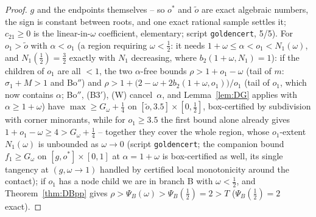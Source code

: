 \documentclass[11pt]{article}
\theoremstyle{definition}
\begin{document}
\begin{proof}
$g$ and the endpoints themselves -- so $o^\ast$ and $\tilde o$ are
exact algebraic numbers, the sign is constant between roots, and one
exact rational sample settles it; $c_{21}\ge0$ is the linear-in-$\omega$
coefficient, elementary; script \texttt{goldencert}, 5/5). For $o_1>\tilde o$ with
$\alpha<o_1$ (a region requiring $\omega<\tfrac12$: it needs
$1+\omega\le\alpha<o_1<N_1(\omega)$, and $N_1(\tfrac12)=\tfrac32$ exactly
with $N_1$ decreasing, where $b_2(1+\omega,N_1)=1$): if the children of
$o_1$ are all $<1$, the two $\alpha$-free bounds
$\rho>1+o_1-\omega$ (tail of $m$: $\sigma_1+M>1$ and Bo$''$) and
$\rho>1+\bigl(2-\omega+2b_2(1+\omega,o_1)\bigr)/o_1$ (tail of $o_1$, which
now contains $\alpha$; Bo$''$, (B3$'$), (W) cancel~$\alpha$, and
Lemma~\ref{lem:DG} applies with $\alpha\ge1+\omega$) have
$\max\ge G_\omega+\tfrac14$ on
$[\tilde o,3.5]\times[0,\tfrac12]$, box-certified by subdivision with
corner minorants, while for $o_1\ge3.5$ the first bound alone already
gives $1+o_1-\omega\ge4>G_\omega+\tfrac14$ -- together they
cover the whole region, whose $o_1$-extent $N_1(\omega)$ is unbounded
as $\omega\to0$ (script \texttt{goldencert}; the companion bound
$f_1\ge G_\omega$ on $[g,o^\ast]\times[0,1]$ at $\alpha=1+\omega$
is box-certified as well, its single tangency at $(g,\omega\to1)$
handled by certified local monotonicity around the contact); if $o_1$ has a node child we are in branch B
with $\omega<\tfrac12$, and Theorem~\ref{thm:DBpp} gives
$\rho>\Psi_B(\omega)>\Psi_B(\tfrac12)=2>T$ ($\Psi_B(\tfrac12)=2$ exact).
\end{proof}
\end{document}
